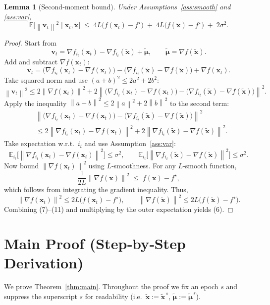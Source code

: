 \documentclass{article}
\newtheorem{lemma}{Lemma}[section]
\newcommand{\EE}{\mathbb{E}}
\newcommand{\norm}[1]{\left\|#1\right\|}
\newcommand{\grad}{\nabla}
\begin{document}
\begin{lemma}[Second‑moment bound]\label{lem:variance}
Under Assumptions~\ref{ass:smooth} and \ref{ass:var},
\[
\EE\!\big[\norm{\mathbf{v}_t}^{2}\mid \mathbf{x}_t,\tilde{\mathbf{x}}\big]
\;\le\;
4L\big(f(\mathbf{x}_t)-f^{\star}\big)
\;+\;
4L\big(f(\tilde{\mathbf{x}})-f^{\star}\big)
\;+\;
2\sigma^{2}.
\tag{6}
\]
\end{lemma}
\begin{proof}
Start from
\[
\mathbf{v}_t
=\grad f_{i_t}(\mathbf{x}_t)-\grad f_{i_t}(\tilde{\mathbf{x}})+\tilde{\bm\mu},
\qquad
\tilde{\bm\mu}=\grad f(\tilde{\mathbf{x}}).
\]
Add and subtract $\grad f(\mathbf{x}_t)$:
\[
\mathbf{v}_t
=\big(\grad f_{i_t}(\mathbf{x}_t)-\grad f(\mathbf{x}_t)\big)
-\big(\grad f_{i_t}(\tilde{\mathbf{x}})-\grad f(\tilde{\mathbf{x}})\big)
+\grad f(\mathbf{x}_t).
\]
Take squared norm and use $(a+b)^{2}\le 2a^{2}+2b^{2}$:
\[
\norm{\mathbf{v}_t}^{2}
\le 2\norm{\grad f(\mathbf{x}_t)}^{2}
   +2\norm{\big(\grad f_{i_t}(\mathbf{x}_t)-\grad f(\mathbf{x}_t)\big)
          -\big(\grad f_{i_t}(\tilde{\mathbf{x}})-\grad f(\tilde{\mathbf{x}})\big)}^{2}.
\tag{7}
\]
Apply the inequality $\norm{a-b}^{2}\le2\norm{a}^{2}+2\norm{b}^{2}$ to the second term:
\[
\begin{aligned}
&\norm{\big(\grad f_{i_t}(\mathbf{x}_t)-\grad f(\mathbf{x}_t)\big)
          -\big(\grad f_{i_t}(\tilde{\mathbf{x}})-\grad f(\tilde{\mathbf{x}})\big)}^{2}\\
&\le2\norm{\grad f_{i_t}(\mathbf{x}_t)-\grad f(\mathbf{x}_t)}^{2}
        +2\norm{\grad f_{i_t}(\tilde{\mathbf{x}})-\grad f(\tilde{\mathbf{x}})}^{2}.
\end{aligned}
\tag{8}
\]
Take expectation w.r.t.\ $i_t$ and use Assumption~\ref{ass:var}:
\[
\EE_{i_t}\!\big[\norm{\grad f_{i_t}(\mathbf{x}_t)-\grad f(\mathbf{x}_t)}^{2}\big]
\le\sigma^{2},\qquad
\EE_{i_t}\!\big[\norm{\grad f_{i_t}(\tilde{\mathbf{x}})-\grad f(\tilde{\mathbf{x}})}^{2}\big]
\le\sigma^{2}.
\tag{9}
\]
Now bound $\norm{\grad f(\mathbf{x}_t)}^{2}$ using $L$‑smoothness.
For any $L$‑smooth function,
\[
\frac{1}{2L}\norm{\grad f(\mathbf{x})}^{2}
\;\le\;f(\mathbf{x})-f^{\star},
\tag{10}
\]
which follows from integrating the gradient inequality.
Thus,
\[
\norm{\grad f(\mathbf{x}_t)}^{2}\le2L\big(f(\mathbf{x}_t)-f^{\star}\big),
\qquad
\norm{\grad f(\tilde{\mathbf{x}})}^{2}\le2L\big(f(\tilde{\mathbf{x}})-f^{\star}\big).
\tag{11}
\]
Combining (7)–(11) and multiplying by the outer expectation yields (6). \quad\blacksquare
\end{proof}

\section*{Main Proof (Step‑by‑Step Derivation)}
We prove Theorem~\ref{thm:main}.  Throughout the proof we fix an epoch $s$
and suppress the superscript $s$ for readability (i.e.\ $\tilde{\mathbf{x}}:=\tilde{\mathbf{x}}^{\,s}$,
$\tilde{\bm\mu}:=\tilde{\bm\mu}^{\,s}$).
\end{document}
